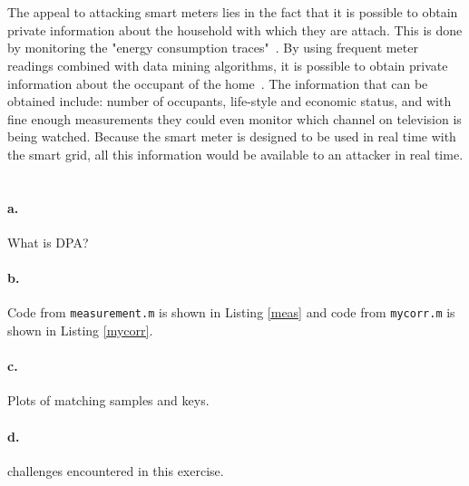 \documentclass[letterpaper]{article}
\begin{document}
\section{}
The appeal to attacking smart meters lies in the fact that it is possible to obtain private information about the household with which they are attach. This is done by monitoring the "energy consumption traces"~\cite{RajagopalanS.R2011SmpA}. By using frequent meter readings combined with data mining algorithms, it is possible to obtain private information about the occupant of the home~\cite{RajagopalanS.R2011SmpA}. The information that can be obtained include: number of occupants, life-style and economic status, and with fine enough measurements they could even monitor which channel on television is being watched. Because the smart meter is designed to be used in real time with the smart grid, all this information would be available to an attacker in real time. 



\section{}

\paragraph{a.}
What is DPA?

\paragraph{b.}
Code from \texttt{measurement.m} is shown in Listing \ref{meas} and code from \texttt{mycorr.m} is shown in Listing \ref{mycorr}.








\paragraph{c.}
Plots of matching samples and keys.

\paragraph{d.}
challenges encountered in this exercise.




\end{document}

